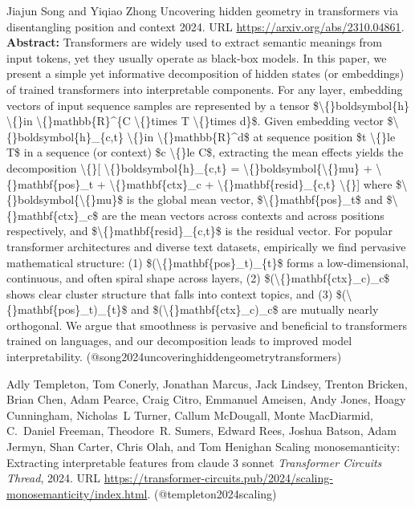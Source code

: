 \documentclass{article} %
\begin{document}
\begin{thebibliography}{}
 Jiajun Song and Yiqiao Zhong \newblock Uncovering hidden geometry in transformers via disentangling position and context 2024. \newblock URL \url{https://arxiv.org/abs/2310.04861}. \newblock \textbf{Abstract:} Transformers are widely used to extract semantic meanings from input tokens, yet they usually operate as black-box models. In this paper, we present a simple yet informative decomposition of hidden states (or embeddings) of trained transformers into interpretable components. For any layer, embedding vectors of input sequence samples are represented by a tensor \$\textbackslash\{\}boldsymbol\{h\} \textbackslash\{\}in \textbackslash\{\}mathbb\{R\}\textasciicircum{}\{C \textbackslash\{\}times T \textbackslash\{\}times d\}\$. Given embedding vector \$\textbackslash\{\}boldsymbol\{h\}\_\{c,t\} \textbackslash\{\}in \textbackslash\{\}mathbb\{R\}\textasciicircum{}d\$ at sequence position \$t \textbackslash\{\}le T\$ in a sequence (or context) \$c \textbackslash\{\}le C\$, extracting the mean effects yields the decomposition \textbackslash\{\}[ \textbackslash\{\}boldsymbol\{h\}\_\{c,t\} = \textbackslash\{\}boldsymbol\{\textbackslash\{\}mu\} + \textbackslash\{\}mathbf\{pos\}\_t + \textbackslash\{\}mathbf\{ctx\}\_c + \textbackslash\{\}mathbf\{resid\}\_\{c,t\} \textbackslash\{\}] where \$\textbackslash\{\}boldsymbol\{\textbackslash\{\}mu\}\$ is the global mean vector, \$\textbackslash\{\}mathbf\{pos\}\_t\$ and \$\textbackslash\{\}mathbf\{ctx\}\_c\$ are the mean vectors across contexts and across positions respectively, and \$\textbackslash\{\}mathbf\{resid\}\_\{c,t\}\$ is the residual vector. For popular transformer architectures and diverse text datasets, empirically we find pervasive mathematical structure: (1) \$(\textbackslash\{\}mathbf\{pos\}\_t)\_\{t\}\$ forms a low-dimensional, continuous, and often spiral shape across layers, (2) \$(\textbackslash\{\}mathbf\{ctx\}\_c)\_c\$ shows clear cluster structure that falls into context topics, and (3) \$(\textbackslash\{\}mathbf\{pos\}\_t)\_\{t\}\$ and \$(\textbackslash\{\}mathbf\{ctx\}\_c)\_c\$ are mutually nearly orthogonal. We argue that smoothness is pervasive and beneficial to transformers trained on languages, and our decomposition leads to improved model interpretability. \newblock (@song2024uncoveringhiddengeometrytransformers)

 Adly Templeton, Tom Conerly, Jonathan Marcus, Jack Lindsey, Trenton Bricken, Brian Chen, Adam Pearce, Craig Citro, Emmanuel Ameisen, Andy Jones, Hoagy Cunningham, Nicholas~L Turner, Callum McDougall, Monte MacDiarmid, C.~Daniel Freeman, Theodore~R. Sumers, Edward Rees, Joshua Batson, Adam Jermyn, Shan Carter, Chris Olah, and Tom Henighan \newblock Scaling monosemanticity: Extracting interpretable features from claude 3 sonnet \newblock \emph{Transformer Circuits Thread}, 2024. \newblock URL \url{https://transformer-circuits.pub/2024/scaling-monosemanticity/index.html}. \newblock (@templeton2024scaling)


\end{thebibliography}
\end{document}

